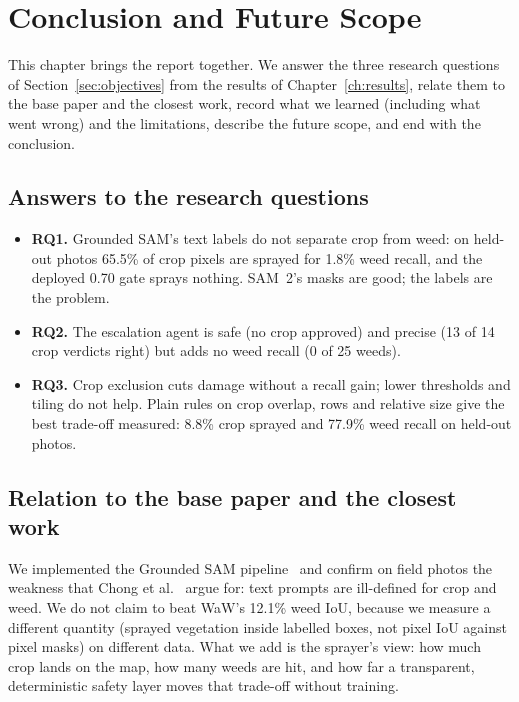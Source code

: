 \chapter{Conclusion and Future Scope}\label{ch:conclusion}

This chapter brings the report together. We answer the three research questions of
Section~\ref{sec:objectives} from the results of Chapter~\ref{ch:results}, relate them to the base paper
and the closest work, record what we learned (including what went wrong) and the limitations, describe
the future scope, and end with the conclusion.

\section{Answers to the research questions}
\begin{itemize}
\item \textbf{RQ1.} Grounded SAM's text labels do not separate crop from weed: on held-out photos
  65.5\% of crop pixels are sprayed for 1.8\% weed recall, and the deployed 0.70 gate sprays nothing.
  SAM~2's masks are good; the labels are the problem.
\item \textbf{RQ2.} The escalation agent is safe (no crop approved) and precise (13 of 14 crop
  verdicts right) but adds no weed recall (0 of 25 weeds).
\item \textbf{RQ3.} Crop exclusion cuts damage without a recall gain; lower thresholds and tiling do
  not help. Plain rules on crop overlap, rows and relative size give the best trade-off measured:
  8.8\% crop sprayed and 77.9\% weed recall on held-out photos.
\end{itemize}

\section{Relation to the base paper and the closest work}
We implemented the Grounded SAM pipeline~\cite{ren2024groundedsam} and confirm on field photos the
weakness that Chong et al.~\cite{chong2025zeroshot} argue for: text prompts are ill-defined for crop
and weed. We do not claim to beat WaW's 12.1\% weed IoU, because we measure a different quantity
(sprayed vegetation inside labelled boxes, not pixel IoU against pixel masks) on different data. What
we add is the sprayer's view: how much crop lands on the map, how many weeds are hit, and how far a
transparent, deterministic safety layer moves that trade-off without training.

